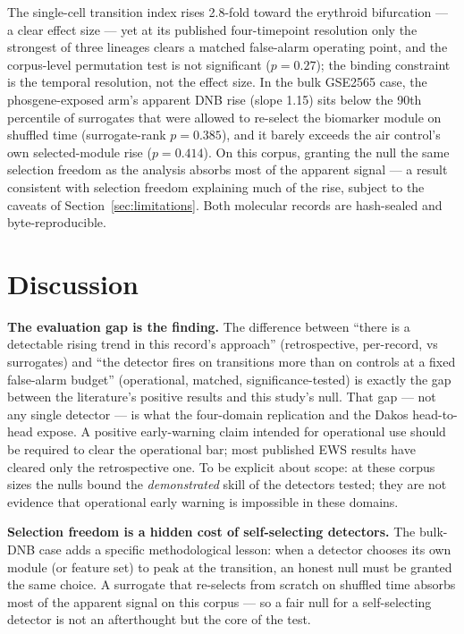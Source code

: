\documentclass[aip,cha,preprint,amsmath,amssymb]{revtex4-2}
\begin{document}
The single-cell transition index rises 2.8-fold toward the erythroid
bifurcation --- a clear effect size --- yet at its published
four-timepoint resolution only the strongest of three lineages clears a
matched false-alarm operating point, and the corpus-level permutation
test is not significant ($p = 0.27$); the binding constraint is the
temporal resolution, not the effect size. In the bulk GSE2565 case, the
phosgene-exposed arm's apparent DNB rise (slope 1.15) sits below the
90th percentile of surrogates that were allowed to re-select the
biomarker module on shuffled time (surrogate-rank $p = 0.385$), and it
barely exceeds the air control's own selected-module rise
($p = 0.414$). On this corpus, granting the null the same selection
freedom as the analysis absorbs most of the apparent signal --- a
result consistent with selection freedom explaining much of the rise,
subject to the caveats of Section~\ref{sec:limitations}. Both molecular
records are hash-sealed and byte-reproducible.

\section{Discussion}\label{sec:discussion}

\textbf{The evaluation gap is the finding.} The difference between
``there is a detectable rising trend in this record's approach''
(retrospective, per-record, vs surrogates) and ``the detector fires on
transitions more than on controls at a fixed false-alarm budget''
(operational, matched, significance-tested) is exactly the gap between
the literature's positive results and this study's null. That gap ---
not any single detector --- is what the four-domain replication and the
Dakos head-to-head expose. A positive early-warning claim intended for
operational use should be required to clear the operational bar; most
published EWS results have cleared only the retrospective one. To be
explicit about scope: at these corpus sizes the nulls bound the
\emph{demonstrated} skill of the detectors tested; they are not
evidence that operational early warning is impossible in these
domains.

\textbf{Selection freedom is a hidden cost of self-selecting
detectors.} The bulk-DNB case adds a specific methodological lesson:
when a detector chooses its own module (or feature set) to peak at the
transition, an honest null must be granted the same choice. A surrogate
that re-selects from scratch on shuffled time absorbs most of the
apparent signal on this corpus --- so a fair null for a self-selecting
detector is not an afterthought but the core of the test.
\end{document}
